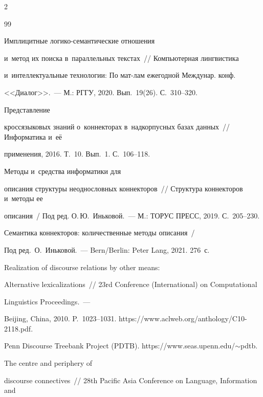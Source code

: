 \begin{multicols}{2}
{{\begin{thebibliography}{99}


 Имплицитные логико-се\-ман\-ти\-че\-ские отношения 


и~метод их поиска в~параллельных текстах~// Компьютерная лингвистика 


и~интеллектуальные технологии: По мат-лам ежегодной Междунар. конф.  


<<Диалог>>.~--- М.: РГГУ, 2020. Вып.~19(26). С.~310--320.




 Представление 


кроссязыковых знаний о~коннекторах в~надкорпусных базах данных~// Информатика и~её 


применения, 2016. Т.~10. Вып.~1. С.~106--118.




 Методы и~средства информатики для 


описания структуры неоднословных коннекторов~// Структура коннекторов и~методы ее 


описания~/ Под ред. О.\,Ю.~Иньковой.~--- М.: ТОРУС ПРЕСС, 2019. С.~205--230.




Семантика коннекторов: количественные методы описания~/


Под ред.\ О.~Иньковой.~--- Bern/Berlin: Peter Lang, 2021. 276~с.




 Realization of discourse relations by other means: 


Alternative lexicalizations~// 23rd Conference (International) on Computational 


Linguistics Proceedings.~--- 


Beijing, China, 2010. P.~1023--1031. {\sf https://www.aclweb.org/anthology/C10-2118.pdf}.




Penn Discourse Treebank Project (PDTB). {\sf https://www.\linebreak seas.upenn.edu/$\sim$pdtb}.




 The centre and periphery of 


discourse connectives~// 28th Pacific Asia Conference on Language, Information and 



\end{thebibliography}}}
\end{multicols}
